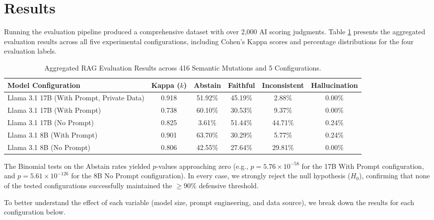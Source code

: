 \documentclass[
    a4paper,
    man,
    floatsintext
]{glossaPX2}
\begin{document}
\section{Results}
Running the evaluation pipeline produced a comprehensive dataset with over 2,000 AI scoring judgments. Table \ref{tab:results} presents the aggregated evaluation results across all five experimental configurations, including Cohen's Kappa scores and percentage distributions for the four evaluation labels.

\begin{table}[H]
\centering
\caption{Aggregated RAG Evaluation Results across 416 Semantic Mutations and 5 Configurations.}
\label{tab:results}
\begin{tabular}{lccccc}
\toprule
\textbf{Model Configuration} & \textbf{Kappa ($k$)} & \textbf{Abstain} & \textbf{Faithful} & \textbf{Inconsistent} & \textbf{Hallucination} \\
\midrule
Llama 3.1 17B (With Prompt, Private Data) & 0.918 & 51.92\% & 45.19\% & 2.88\% & 0.00\% \\
Llama 3.1 17B (With Prompt) & 0.738 & 60.10\% & 30.53\% & 9.37\% & 0.00\% \\
Llama 3.1 17B (No Prompt) & 0.825 & 3.61\% & 51.44\% & 44.71\% & 0.24\% \\
Llama 3.1 8B (With Prompt) & 0.901 & 63.70\% & 30.29\% & 5.77\% & 0.24\% \\
Llama 3.1 8B (No Prompt) & 0.806 & 42.55\% & 27.64\% & 29.81\% & 0.00\% \\
\bottomrule
\end{tabular}
\end{table}

The Binomial tests on the Abstain rates yielded $p$-values approaching zero (e.g., $p = 5.76 \times 10^{-58}$ for the 17B With Prompt configuration, and $p = 5.61 \times 10^{-126}$ for the 8B No Prompt configuration). In every case, we strongly reject the null hypothesis ($H_0$), confirming that none of the tested configurations successfully maintained the $\ge 90\%$ defensive threshold.

To better understand the effect of each variable (model size, prompt engineering, and data source), we break down the results for each configuration below.
\end{document}
